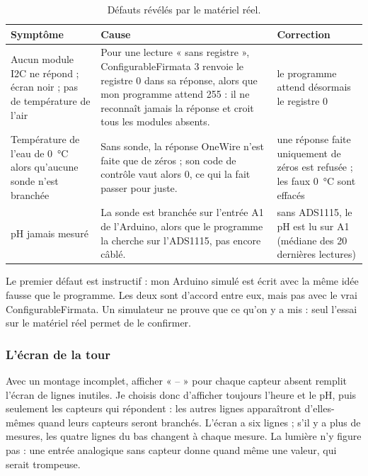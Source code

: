 \begin{table}[H]
\centering
\small
\begin{tabularx}{\textwidth}{|Y|Y|Y|}
\hline
\textbf{Symptôme} & \textbf{Cause} & \textbf{Correction} \\
\hline
Aucun module I2C ne répond ; écran noir ; pas de température de l'air & Pour une lecture « sans registre », ConfigurableFirmata 3 renvoie le registre 0 dans sa réponse, alors que mon programme attend 255 : il ne reconnaît jamais la réponse et croit tous les modules absents. & le programme attend désormais le registre 0 \\
\hline
Température de l'eau de \qty{0}{\celsius} alors qu'aucune sonde n'est branchée & Sans sonde, la réponse OneWire n'est faite que de zéros ; son code de contrôle vaut alors 0, ce qui la fait passer pour juste. & une réponse faite uniquement de zéros est refusée ; les faux \qty{0}{\celsius} sont effacés \\
\hline
pH jamais mesuré & La sonde est branchée sur l'entrée A1 de l'Arduino, alors que le programme la cherche sur l'ADS1115, pas encore câblé. & sans ADS1115, le pH est lu sur A1 (médiane des 20 dernières lectures) \\
\hline
\end{tabularx}
\caption{Défauts révélés par le matériel réel.}
\end{table}

\begin{aretenir}
Le premier défaut est instructif : mon Arduino simulé est écrit avec la même idée fausse que le programme. Les deux sont d'accord entre eux, mais pas avec le vrai ConfigurableFirmata. Un simulateur ne prouve que ce qu'on y a mis : seul l'essai sur le matériel réel permet de le confirmer.
\end{aretenir}

\subsubsection*{L'écran de la tour}

Avec un montage incomplet, afficher « -- » pour chaque capteur absent remplit l'écran de lignes inutiles. Je choisis donc d'afficher toujours l'heure et le pH, puis seulement les capteurs qui répondent : les autres lignes apparaîtront d'elles-mêmes quand leurs capteurs seront branchés. L'écran a six lignes ; s'il y a plus de mesures, les quatre lignes du bas changent à chaque mesure. La lumière n'y figure pas : une entrée analogique sans capteur donne quand même une valeur, qui serait trompeuse.

